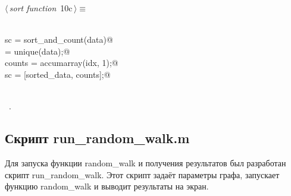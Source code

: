 \documentclass{article}
\begin{document}
\begin{flushleft} \small
\begin{minipage}{\linewidth}\label{scrap12}\raggedright\small
{} $\langle\,${\itshape sort function}\nobreak\ {\footnotesize {10c}}$\,\rangle\equiv$
\vspace{-1ex}
\begin{list}{}{} \item
\mbox{}\verb@@\\
\mbox{}\verb@function sc = sort_and_count(data)@\\
\mbox{} = unique(data);@\\
\mbox{}\verb@    counts = accumarray(idx, 1);@\\
\mbox{}\verb@    sc = [sorted_data, counts];@\\
\mbox{}\verb@end@\\
\mbox{}\verb@@{\NWsep}
\end{list}
\vspace{-1.5ex}
\footnotesize
\begin{list}{}{\setlength{\itemsep}{-\parsep}\setlength{\itemindent}{-\leftmargin}}
\item \NWtxtMacroRefIn\ .

\item{}
\end{list}
\end{minipage}\vspace{4ex}
\end{flushleft}
\subsection{Скрипт run_random_walk.m}
Для запуска функции random_walk и получения результатов был разработан скрипт run_random_walk. Этот скрипт задаёт параметры графа, запускает функцию random_walk и выводит результаты на экран.
\end{document}
